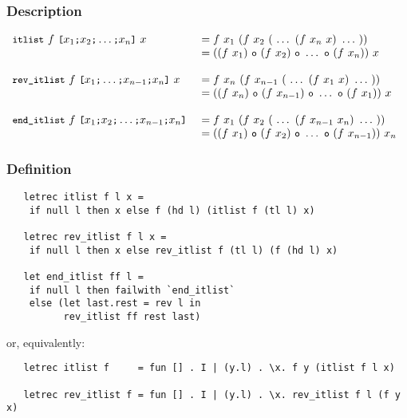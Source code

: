 \subsubsection*{Description}

\[ 
\begin{array}{@{}ll}
\ml{itlist}\ f\ \ml{[}x_1\ml{;}x_2\ml{;}\ldots\ml{;}x_n\ml{]}\ x & =
f\ x_1\ (f\ x_2\ (\ \ldots\ (f\ x_n\ x)\ \ldots\ ))\\
 &= ((f\ x_1)\ \ml{o}\ (f\ x_2)\ \ml{o}\ \ldots\ \ml{o}\ (f\ x_n))\ x\\
 & \\
\ml{rev\_itlist}\ f\ \ml{[}x_1\ml{;}\ldots\ml{;}x_{n-1}\ml{;}x_n\ml{]}\ x& =
f\ x_n\ (f\ x_{n-1}\ (\ \ldots\ (f\ x_1\ x)\ \ldots\ ))\\
 &= ((f\ x_n)\ \ml{o}\ (f\ x_{n-1})\ \ml{o}\ \ldots\ \ml{o}\ (f\ x_1))\ x\\
 & \\
\ml{end\_itlist}\ f\ \ml{[}x_1\ml{;}x_2\ml{;}\ldots\ml{;}x_{n-1}\ml{;}x_n\ml{]}\ & =
f\ x_1\ (f\ x_2\ (\ \ldots\ (f\ x_{n-1}\ x_n)\ \ldots\ ))\\
 &= ((f\ x_1)\ \ml{o}\ (f\ x_2)\ \ml{o}\ \ldots\ \ml{o}\ (f\ x_{n-1}))\ x_n\\
\end{array} \]

\subsubsection*{Definition}

\begin{hol}\begin{verbatim}
   letrec itlist f l x =
    if null l then x else f (hd l) (itlist f (tl l) x)

   letrec rev_itlist f l x = 
    if null l then x else rev_itlist f (tl l) (f (hd l) x)

   let end_itlist ff l =
    if null l then failwith `end_itlist`
    else (let last.rest = rev l in
          rev_itlist ff rest last)
\end{verbatim}\end{hol}

\noindent or, equivalently:

\begin{hol}\begin{verbatim}
   letrec itlist f     = fun [] . I | (y.l) . \x. f y (itlist f l x)

   letrec rev_itlist f = fun [] . I | (y.l) . \x. rev_itlist f l (f y x)
\end{verbatim}\end{hol}


